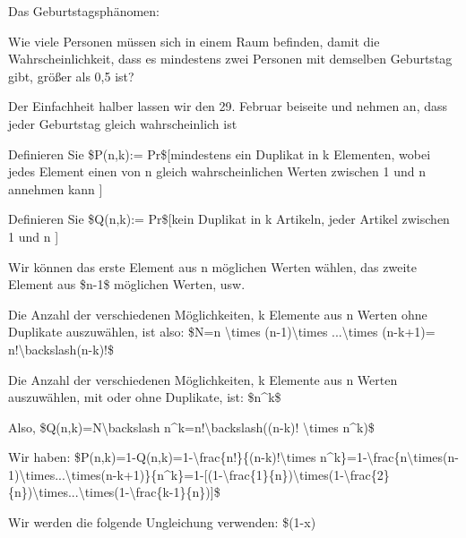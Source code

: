 \documentclass[a4paper]{article}
\begin{document}
\begin{multicols}{3}
      \begin{itemize*}
            \item Das Geburtstagsphänomen:
            \begin{itemize*}
                  \item Wie viele Personen müssen sich in einem Raum befinden, damit die Wahrscheinlichkeit, dass es mindestens zwei Personen mit demselben Geburtstag gibt, größer als 0,5 ist?
                  \item Der Einfachheit halber lassen wir den 29. Februar beiseite und nehmen an, dass jeder Geburtstag gleich wahrscheinlich ist
            \end{itemize*}
            \item Definieren Sie \$P(n,k):= Pr\${[}mindestens ein Duplikat in k
            Elementen, wobei jedes Element einen von n gleich wahrscheinlichen
            Werten zwischen 1 und n annehmen kann {]}
            \item Definieren Sie \$Q(n,k):= Pr\${[}kein Duplikat in k Artikeln, jeder
            Artikel zwischen 1 und n {]}
            \begin{itemize*}
                  \item Wir können das erste Element aus n möglichen Werten wählen, das zweite Element aus \$n-1\$ möglichen Werten, usw.
                  \item Die Anzahl der verschiedenen Möglichkeiten, k Elemente aus n Werten ohne Duplikate auszuwählen, ist also: \$N=n \textbackslash times (n-1)\textbackslash times ...\textbackslash times (n-k+1)= n!\textbackslash backslash(n-k)!\$
                  \item Die Anzahl der verschiedenen Möglichkeiten, k Elemente aus n Werten auszuwählen, mit oder ohne Duplikate, ist: \$n\^{}k\$
                  \item Also, \$Q(n,k)=N\textbackslash backslash n\^{}k=n!\textbackslash backslash((n-k)! \textbackslash times n\^{}k)\$
            \end{itemize*}
            \item Wir haben:
            \$P(n,k)=1-Q(n,k)=1-\textbackslash frac\{n!\}\{(n-k)!\textbackslash times
            n\^{}k\}=1-\textbackslash frac\{n\textbackslash times(n-1)\textbackslash times...\textbackslash times(n-k+1)\}\{n\^{}k\}=1-{[}(1-\textbackslash frac\{1\}\{n\})\textbackslash times(1-\textbackslash frac\{2\}\{n\})\textbackslash times...\textbackslash times(1-\textbackslash frac\{k-1\}\{n\}){]}\$
            \item Wir werden die folgende Ungleichung verwenden: \$(1-x)

\end{itemize*}
\end{multicols}
\end{document}
